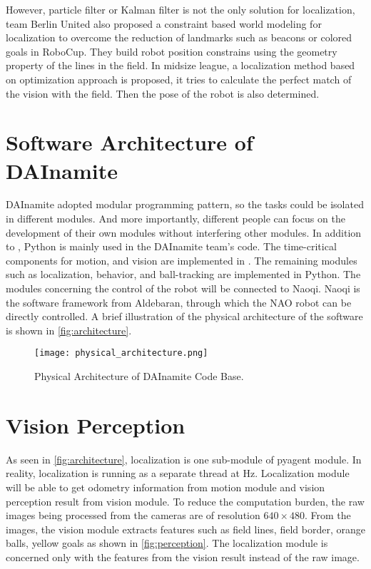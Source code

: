 However, particle filter or Kalman filter is not the only solution for localization, team Berlin United also proposed a constraint based world modeling for localization \cite{Gohring2009} to overcome the reduction of landmarks such as beacons or colored goals in RoboCup. They build robot position constrains using the geometry property of the lines in the field. In midsize league, a localization method based on optimization approach \cite{Lauer2006} is proposed, it tries to calculate the perfect match of the vision with the field. Then the pose of the robot is also determined.



\section{Software Architecture of DAInamite}\label{sec:arch}
DAInamite adopted modular programming pattern, so the tasks could be isolated in different modules. And more importantly, different people can focus on the development of their own modules without interfering other modules. In addition to \cpp{}, Python is mainly used in the DAInamite team's code.
The time-critical components for motion, and vision are implemented in \cpp{}. The remaining modules such as localization, behavior, and ball-tracking are implemented in Python. The modules concerning the control of the robot will be connected to Naoqi. Naoqi is the software framework from Aldebaran, through which the NAO robot can be directly controlled. A brief illustration of the physical architecture of the software is shown in \autoref{fig:architecture}. 

\begin{figure}[h!]
  \centering
  \texttt{[image: physical\_architecture.png]}
  \caption{Physical Architecture of DAInamite Code Base.}
  \label{fig:architecture}
\end{figure}

\section{Vision Perception}\label{sec:vision}
As seen in \autoref{fig:architecture}, localization is one sub-module of pyagent module. In reality, localization is running as a separate thread at \unit[30]{Hz}. Localization module will be able to get odometry information from motion module and vision perception result from vision module. To reduce the computation burden, the raw images being processed from the cameras are of resolution $640 \times 480$. From the images, the vision module extracts features such as field lines, field border, orange balls, yellow goals as shown in \autoref{fig:perception}. The localization module is concerned only with the features from the vision result instead of the raw image.

